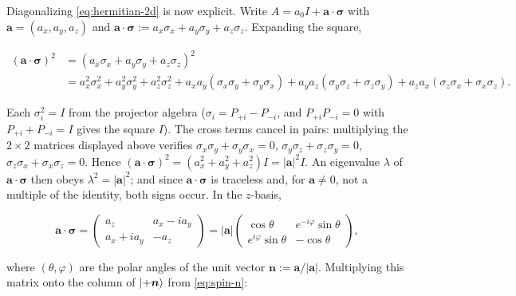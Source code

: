 Diagonalizing \eqref{eq:hermitian-2d} is now explicit. Write $A=a_0I+\bm a\cdot\bm\sigma$ with $\bm a=(a_x,a_y,a_z)$ and $\bm a\cdot\bm\sigma:=a_x\sigma_x+a_y\sigma_y+a_z\sigma_z$. Expanding the square,
\begin{linenomath}
\begin{align}
    (\bm a\cdot\bm\sigma)^2
    &= (a_x\sigma_x+a_y\sigma_y+a_z\sigma_z)^2 \nonumber\\
    &= a_x^2\sigma_x^2+a_y^2\sigma_y^2+a_z^2\sigma_z^2
       + a_x a_y(\sigma_x\sigma_y+\sigma_y\sigma_x)
       + a_y a_z(\sigma_y\sigma_z+\sigma_z\sigma_y)
       + a_z a_x(\sigma_z\sigma_x+\sigma_x\sigma_z).
\end{align}
\end{linenomath}
Each $\sigma_i^2=I$ from the projector algebra ($\sigma_i=P_{+i}-P_{-i}$, and $P_{+i}P_{-i}=0$ with $P_{+i}+P_{-i}=I$ gives the square $I$). The cross terms cancel in pairs: multiplying the $2\times2$ matrices displayed above verifies $\sigma_x\sigma_y+\sigma_y\sigma_x=0$, $\sigma_y\sigma_z+\sigma_z\sigma_y=0$, $\sigma_z\sigma_x+\sigma_x\sigma_z=0$. Hence $(\bm a\cdot\bm\sigma)^2=(a_x^2+a_y^2+a_z^2)I=|\bm a|^2 I$. An eigenvalue $\lambda$ of $\bm a\cdot\bm\sigma$ then obeys $\lambda^2=|\bm a|^2$; and since $\bm a\cdot\bm\sigma$ is traceless and, for $\bm a\neq0$, not a multiple of the identity, both signs occur. In the $z$-basis,
\begin{linenomath}
\begin{equation}
    \bm a\cdot\bm\sigma=
    \begin{pmatrix}
        a_z & a_x-ia_y\\
        a_x+ia_y & -a_z
    \end{pmatrix}
    =|\bm a|
    \begin{pmatrix}
        \cos\theta & e^{-i\varphi}\sin\theta\\
        e^{i\varphi}\sin\theta & -\cos\theta
    \end{pmatrix},
\end{equation}
\end{linenomath}
where $(\theta,\varphi)$ are the polar angles of the unit vector $\bm n:=\bm a/|\bm a|$. Multiplying this matrix onto the column of $\ket{+\bm n}$ from \eqref{eq:spin-n}:
